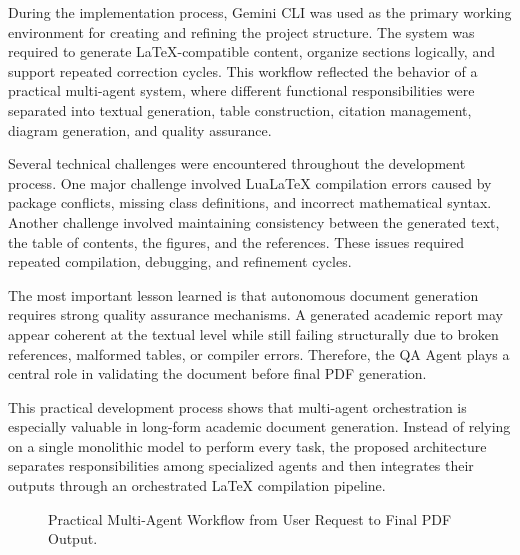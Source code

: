 During the implementation process, Gemini CLI was used as the primary working environment for creating and refining the project structure. The system was required to generate LaTeX-compatible content, organize sections logically, and support repeated correction cycles. This workflow reflected the behavior of a practical multi-agent system, where different functional responsibilities were separated into textual generation, table construction, citation management, diagram generation, and quality assurance.

Several technical challenges were encountered throughout the development process. One major challenge involved LuaLaTeX compilation errors caused by package conflicts, missing class definitions, and incorrect mathematical syntax. Another challenge involved maintaining consistency between the generated text, the table of contents, the figures, and the references. These issues required repeated compilation, debugging, and refinement cycles.

The most important lesson learned is that autonomous document generation requires strong quality assurance mechanisms. A generated academic report may appear coherent at the textual level while still failing structurally due to broken references, malformed tables, or compiler errors. Therefore, the QA Agent plays a central role in validating the document before final PDF generation.

This practical development process shows that multi-agent orchestration is especially valuable in long-form academic document generation. Instead of relying on a single monolithic model to perform every task, the proposed architecture separates responsibilities among specialized agents and then integrates their outputs through an orchestrated LaTeX compilation pipeline.

\begin{figure}[htbp]
\centering
{}
\caption{Practical Multi-Agent Workflow from User Request to Final PDF Output.}
\label{fig:practical_agent_workflow}
\end{figure}

